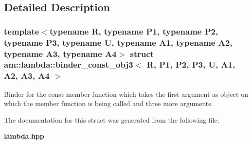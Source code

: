 \subsection{Detailed Description}
\subsubsection*{template$<$typename R, typename P1, typename P2, typename P3, typename U, typename A1, typename A2, typename A3, typename A4$>$ struct am::lambda::binder\_\-const\_\-obj3$<$ R, P1, P2, P3, U, A1, A2, A3, A4 $>$}

Binder for the const member function which takes the first argument as object on which the member function is being called and three more arguments. 



The documentation for this struct was generated from the following file:\begin{CompactItemize}
\item 
{\bf lambda.hpp}\end{CompactItemize}
